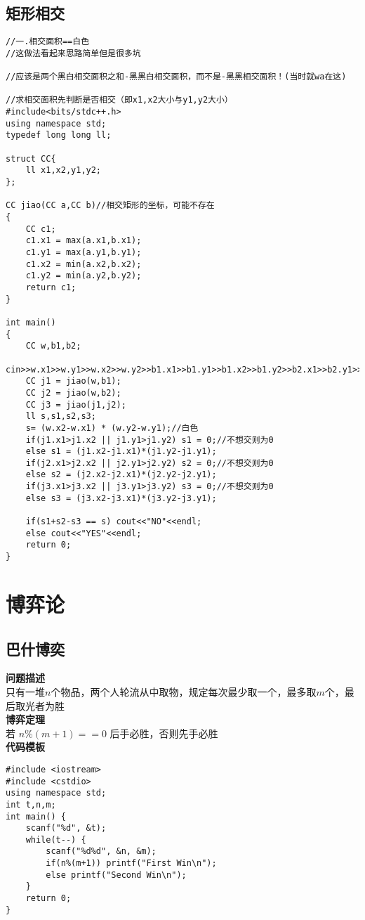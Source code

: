 \subsection{矩形相交}
\begin{lstlisting}
//一.相交面积==白色
//这做法看起来思路简单但是很多坑

//应该是两个黑白相交面积之和-黑黑白相交面积，而不是-黑黑相交面积！(当时就wa在这)

//求相交面积先判断是否相交（即x1,x2大小与y1,y2大小）
#include<bits/stdc++.h>
using namespace std;
typedef long long ll;

struct CC{
	ll x1,x2,y1,y2;
};

CC jiao(CC a,CC b)//相交矩形的坐标，可能不存在
{
	CC c1;
	c1.x1 = max(a.x1,b.x1);
	c1.y1 = max(a.y1,b.y1);
	c1.x2 = min(a.x2,b.x2);
	c1.y2 = min(a.y2,b.y2);
	return c1;
}

int main()
{
	CC w,b1,b2;
	cin>>w.x1>>w.y1>>w.x2>>w.y2>>b1.x1>>b1.y1>>b1.x2>>b1.y2>>b2.x1>>b2.y1>>b2.x2>>b2.y2;
	CC j1 = jiao(w,b1);
	CC j2 = jiao(w,b2);
	CC j3 = jiao(j1,j2);
	ll s,s1,s2,s3;
	s= (w.x2-w.x1) * (w.y2-w.y1);//白色
	if(j1.x1>j1.x2 || j1.y1>j1.y2) s1 = 0;//不想交则为0
	else s1 = (j1.x2-j1.x1)*(j1.y2-j1.y1);
	if(j2.x1>j2.x2 || j2.y1>j2.y2) s2 = 0;//不想交则为0
	else s2 = (j2.x2-j2.x1)*(j2.y2-j2.y1);
	if(j3.x1>j3.x2 || j3.y1>j3.y2) s3 = 0;//不想交则为0
	else s3 = (j3.x2-j3.x1)*(j3.y2-j3.y1);

	if(s1+s2-s3 == s) cout<<"NO"<<endl;
	else cout<<"YES"<<endl;
	return 0;
}
\end{lstlisting}


\section{博弈论}
\subsection{巴什博奕}
\textbf{问题描述}\\
只有一堆$n$个物品，两个人轮流从中取物，规定每次最少取一个，最多取$m$个，最后取光者为胜\\
\textbf{博弈定理}\\
若 $n\%(m+1)==0$ 后手必胜，否则先手必胜\\
\textbf{代码模板}\\
\begin{lstlisting}
#include <iostream>
#include <cstdio>
using namespace std;
int t,n,m;
int main() {
	scanf("%d", &t);
	while(t--) {
		scanf("%d%d", &n, &m);
		if(n%(m+1)) printf("First Win\n");
		else printf("Second Win\n");
	}
	return 0;
} 
\end{lstlisting}

